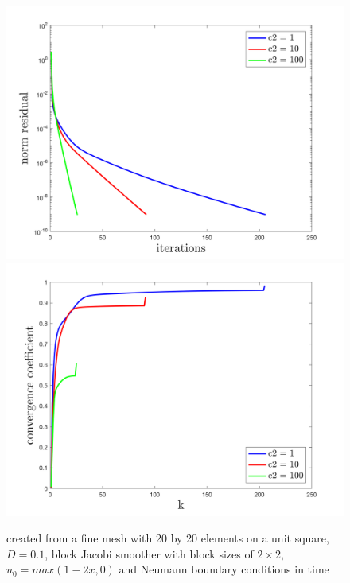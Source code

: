 \documentclass[../draft_1.tex]{subfiles}
\begin{document}
\begin{figure}[h!]
	\centering
	\includegraphics[scale=0.4]{images/implementation/c2_comparison/res_norm}
	\includegraphics[scale=0.4]{images/implementation/c2_comparison/conv_rate}
	\caption{created from a fine mesh with 20 by 20 elements on a unit square, $D = 0.1$, block Jacobi smoother with block sizes of $2 \times 2$, $u_0 = max(1-2x, 0)$ and Neumann boundary conditions in time}
\end{figure}
\end{document}
